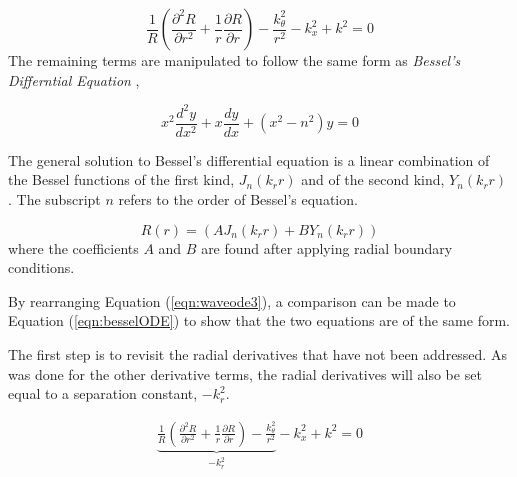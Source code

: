 \begin{frame}
    

\begin{equation}
    \frac{1}{R}
    \left(      
    \frac{\partial^2 R}{\partial r^2 } +
    \frac{1}{r}\frac{\partial R}{\partial r}  
\right) -
    \frac{k_{\theta}^2}{r^2}-  
    k_x^2 + k^2 = 0
    \label{eqn:waveode3}
\end{equation}
The remaining terms are manipulated to follow the same form as \textit{Bessel's Differntial 
Equation} ,

\begin{equation}
    x^2 \frac{d^2 y}{dx^2} + x \frac{dy }{dx } + (x^2 - n^2) y = 0
    \label{eqn:besselODE}
\end{equation}

The general solution to Bessel's differential equation is a linear combination of
the Bessel functions of the first kind, $J_n(k_r r)$ and of the second kind, $Y_n(k_r r)$ 
\cite{wolphram:bessel}. The subscript $n$ refers to the order of Bessel's equation.
    
\begin{equation}
    R(r) = (AJ_n(k_r r) + BY_n(k_r r)) 
    \label{eqn:besselsolution}
\end{equation}
where the coefficients $A$ and $B$ are found after applying radial
boundary conditions. %
\end{frame}
\begin{frame}
By rearranging Equation (\ref{eqn:waveode3}), a comparison can be made to Equation
(\ref{eqn:besselODE}) to show that the two equations are of the same form. 

The first step is to revisit the radial derivatives that have not been addressed.
As was done for the other derivative terms, the radial derivatives will also 
be set equal to a separation constant, $-k_r^2$. 

\begin{align}
    \underbrace{\frac{1}{R}
    \left(      
    \frac{\partial^2 R}{\partial r^2 } +
    \frac{1}{r}\frac{\partial R}{\partial r}  
\right) -
    \frac{k_{\theta}^2}{r^2}}_{-k_r^2}-  
    k_x^2 + k^2 = 0
    \label{eqn:wavenumber_without_kr}
\end{align}

\end{frame}
